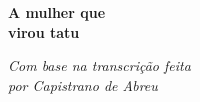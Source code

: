 

\begingroup\thispagestyle{empty}\vspace*{.05\textheight} 

              {\formular
              \huge
              \noindent
              \textbf{A mulher que\\
              virou tatu}\\ 
              
              \vspace{-0.5cm}
              
              }

              \vspace{0.5cm}

              \noindent{}\textit{Com base na transcrição feita\\ por Capistrano de Abreu}

\endgroup
\vfill
\pagebreak